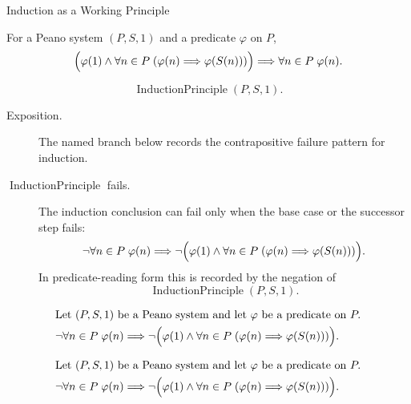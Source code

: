 \begin{topicbox}{Induction as a Working Principle}
\begin{remark*}
For a Peano system $(P,S,1)$ and a predicate $\varphi$ on $P$,
\[
\Bigl(\varphi(1) \land
\forall n \in P\;(\varphi(n) \Longrightarrow \varphi(S(n)))\Bigr)
\Longrightarrow
\forall n \in P\;\varphi(n).
\]
\end{remark*}

\begin{remark*}
\[
\operatorname{InductionPrinciple}(P,S,1).
\]
\end{remark*}



\begin{remark*}
\begin{description}
  \item[Exposition.] The named branch below records the contrapositive failure
  pattern for induction.
  \item[\(\operatorname{InductionPrinciple}\) fails.] The induction conclusion
  can fail only when the base case or the successor step fails:
  \[
  \neg\forall n \in P\;\varphi(n)
  \Longrightarrow
  \neg\Bigl(\varphi(1) \land
  \forall n \in P\;(\varphi(n) \Longrightarrow \varphi(S(n)))\Bigr).
  \]
  In predicate-reading form this is recorded by the negation of
  \[
  \operatorname{InductionPrinciple}(P,S,1).
  \]
\end{description}
\end{remark*}

\begin{remark*}
\[
\begin{aligned}
&\text{Let } (P,S,1) \text{ be a Peano system and let } \varphi
\text{ be a predicate on } P.\\
&\neg\forall n \in P\;\varphi(n)
\Longrightarrow
\neg\Bigl(\varphi(1) \land
\forall n \in P\;(\varphi(n) \Longrightarrow \varphi(S(n)))\Bigr).
\end{aligned}
\]
\end{remark*}

\begin{remark*}
\[
\begin{aligned}
&\text{Let } (P,S,1) \text{ be a Peano system and let } \varphi
\text{ be a predicate on } P.\\
&\neg\forall n \in P\;\varphi(n)
\Longrightarrow
\neg\Bigl(\varphi(1) \land
\forall n \in P\;(\varphi(n) \Longrightarrow \varphi(S(n)))\Bigr).
\end{aligned}
\]
\end{remark*}


\end{topicbox}
